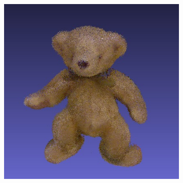 \documentclass[letterpaper, 10 pt, conference]{ieeeconf}  %
\begin{document}
\begin{figure}[th]
\begin{subfigure}[b]{0.5\linewidth}
                \includegraphics[width=\linewidth]{../models/bear.jpg}
        \end{subfigure}
        

\end{figure}
\end{document}

